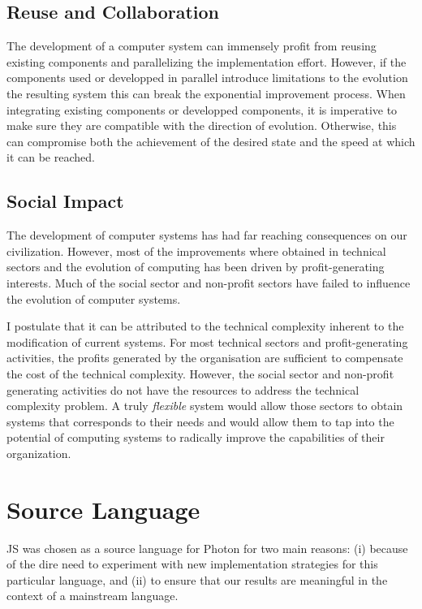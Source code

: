 \subsection{Reuse and Collaboration}
The development of a computer system can immensely profit from reusing
existing components and parallelizing the implementation effort.
However, if the components used or developped in parallel introduce limitations
to the evolution the resulting system this can break the exponential
improvement process.  When integrating existing components or developped
components, it is imperative to make sure they are compatible with the
direction of evolution.  Otherwise, this can compromise both the achievement of
the desired state and the speed at which it can be reached.

\subsection{Social Impact}
The development of computer systems has had far reaching consequences on our
civilization. However, most of the improvements where obtained in technical
sectors and the evolution of computing has been driven by profit-generating
interests. Much of the social sector and non-profit sectors have failed to 
influence the evolution of computer systems.

I postulate that it can be attributed to the technical complexity inherent to
the modification of current systems. For most technical sectors and
profit-generating activities, the profits generated by the organisation are
sufficient to compensate the cost of the technical complexity. However, the
social sector and non-profit generating activities do not have the resources to
address the technical complexity problem.  A truly \textit{flexible} system
would allow those sectors to obtain systems that corresponds to their needs and
would allow them to tap into the potential of computing systems to radically
improve the capabilities of their organization.


\section{Source Language}

JS was chosen as a source language for Photon for two main reasons: (i)
because of the dire need to experiment with new implementation strategies for
this particular language, and (ii) to ensure that our results are meaningful in
the context of a mainstream language. 

